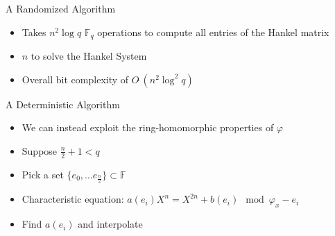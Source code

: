 \documentclass{beamer}
\newcommand{\f}{\mathbb{F}}
\begin{document}

\begin{frame}{A Randomized Algorithm}
    \begin{itemize}
        \item Takes $n^2 \log q$ $\f_q$ operations to compute all entries of the Hankel matrix
    \item $n$ to solve the Hankel System
    \item Overall bit complexity of $O\tilde{~}(n^2 \log^2 q)$
    \end{itemize}
\end{frame}


\begin{frame}{A Deterministic Algorithm}

\begin{itemize}
    \item We can instead exploit the ring-homomorphic properties of $\varphi$
    \item Suppose $ \frac{n}{2} + 1 < q$
    \item Pick a set $\{e_0, \ldots e_{\frac{n}{2}}\} \subset \mathbb{F}$
    \item Characteristic equation: $a(e_i) X^n  = X^{2n} + b(e_i) \mod \varphi_{x} - e_i $
    \item Find $a(e_i)$ and interpolate
\end{itemize}
    
\end{frame}


\end{document}
